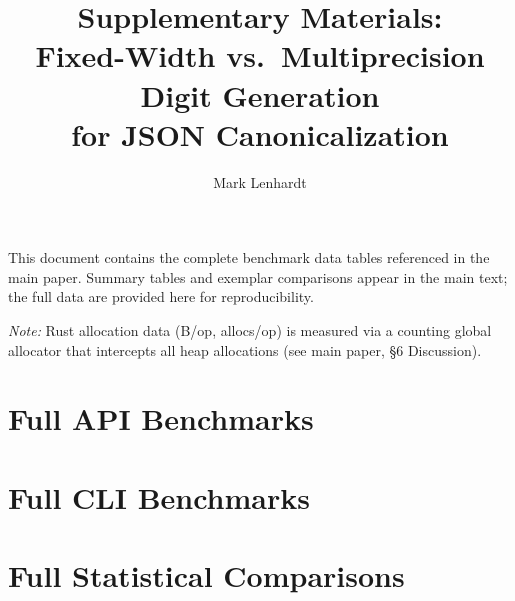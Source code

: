 \documentclass[10pt]{article}
\begin{document}
\title{Supplementary Materials:\\Fixed-Width vs.\ Multiprecision Digit Generation\\for JSON Canonicalization}
\author{Mark Lenhardt}
\date{}
\maketitle

\noindent This document contains the complete benchmark data tables
referenced in the main paper.  Summary tables and exemplar comparisons
appear in the main text; the full data are provided here for
reproducibility.

\emph{Note:} Rust allocation data (B/op, allocs/op) is measured via a
counting global allocator that intercepts all heap allocations (see
main paper, \S6 Discussion).

\begin{landscape}

\section{Full API Benchmarks}


\section{Full CLI Benchmarks}


\section{Full Statistical Comparisons}


\end{landscape}
\end{document}
